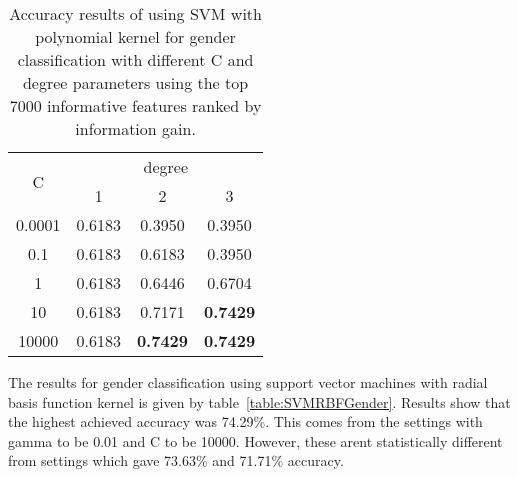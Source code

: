 \documentclass[a4paper]{llncs}
\begin{document}
\begin{table}[!htbp]
\centering
\begin{tabular}{|c|c|c|c|}
\hline
\multirow{2}{*}{C} & \multicolumn{3}{c|}{degree}                \\ \cline{2-4} 
                   & 1      & 2               & 3               \\ \hline
0.0001             & 0.6183 & 0.3950          & 0.3950          \\ \hline
0.1                & 0.6183 & 0.6183          & 0.3950          \\ \hline
1                  & 0.6183 & 0.6446          & 0.6704          \\ \hline
10                 & 0.6183 & 0.7171          & \textbf{0.7429} \\ \hline
10000              & 0.6183 & \textbf{0.7429} & \textbf{0.7429} \\ \hline
\end{tabular}
\caption{Accuracy results of using SVM with polynomial kernel for gender classification with different C and degree parameters using the top 7000 informative features ranked by information gain.}
\label{table:SVMPolyGender}
\end{table}

The results for gender classification using support vector machines with radial basis function kernel is given by table~\ref{table:SVMRBFGender}. Results show  that the highest achieved accuracy was 74.29\%. This comes from the settings with gamma to be 0.01 and C to be 10000. However, these arent statistically different from settings which gave 73.63\% and 71.71\% accuracy.
\end{document}
